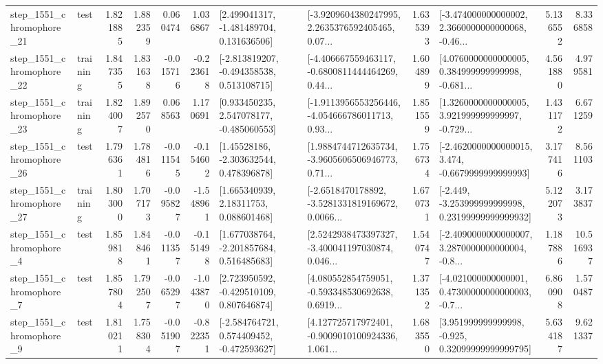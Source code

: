 \begin{tabular}{llrrrrllrlrr}
 step\_1551\_chromophore\_21 &      test &      1.821885 &    1.882359 &      0.060474 &  1.036867 &    [2.499041317, -1.481489704, 0.131636506] &  [-3.9209604380247995, 2.2635376592405465, 0.07... &       1.635393 &  [-3.474000000000002, 2.3660000000000068, -0.46... &            5.136552 &          8.336858 \\
 step\_1551\_chromophore\_22 &  training &      1.847355 &    1.831638 &     -0.015716 & -0.223618 &   [-2.813819207, -0.494358538, 0.513108715] &  [-4.406667559463117, -0.6800811444464269, 0.44... &       1.604899 &  [4.0760000000000005, 0.384999999999998, -0.681... &            4.561880 &          4.979581 \\
 step\_1551\_chromophore\_23 &  training &      1.824007 &    1.892570 &      0.068563 &  1.170691 &    [0.933450235, 2.547078177, -0.485060553] &  [-1.9113956553256446, -4.054666786011713, 0.93... &       1.851559 &  [1.3260000000000005, 3.921999999999997, -0.729... &            1.431172 &          6.671259 \\
 step\_1551\_chromophore\_26 &      test &      1.796361 &    1.784816 &     -0.011545 & -0.154602 &     [1.45528186, -2.303632544, 0.478396878] &  [1.9884744712635734, -3.9605606506946773, 0.71... &       1.756734 &  [-2.4620000000000015, 3.474, -0.6679999999999993] &            3.177416 &          8.561103 \\
 step\_1551\_chromophore\_27 &  training &      1.803000 &    1.707173 &     -0.095827 & -1.548961 &      [1.665340939, 2.18311753, 0.088601468] &  [-2.6518470178892, -3.5281331819169672, 0.0066... &       1.670731 &  [-2.449, -3.253999999999998, 0.23199999999999932] &            5.122073 &          3.173837 \\
  step\_1551\_chromophore\_4 &      test &      1.859818 &    1.848461 &     -0.011357 & -0.151498 &    [1.677038764, -2.201857684, 0.516485683] &  [2.5242938473397327, -3.400041197030874, 0.046... &       1.540747 &  [-2.4090000000000007, 3.2870000000000004, -0.8... &            1.187886 &         10.516937 \\
  step\_1551\_chromophore\_7 &      test &      1.857804 &    1.792507 &     -0.065297 & -1.043870 &    [2.723950592, -0.429510109, 0.807646874] &  [4.080552854759051, -0.593348530692638, 0.6919... &       1.371352 &  [-4.021000000000001, 0.47300000000000003, -0.7... &            6.860908 &          1.570487 \\
  step\_1551\_chromophore\_9 &      test &      1.810211 &    1.758304 &     -0.051907 & -0.822351 &   [-2.584764721, 0.574409452, -0.472593627] &  [4.127725717972401, -0.9009010100924336, 1.061... &       1.683550 &   [3.951999999999998, -0.925, 0.32099999999999795] &            5.634187 &          9.621337 \\

\end{tabular}
